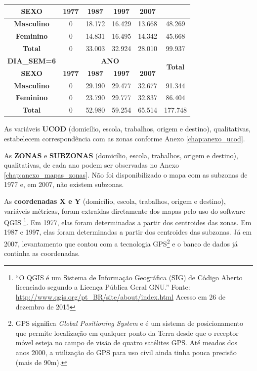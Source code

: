 \begin{table}[htb]
{\begin{tabular}{cccccc}
		\textbf{SEXO} & \textbf{1977} & \textbf{1987} & \textbf{1997} & \multicolumn{1}{c}{\textbf{2007}} & \multicolumn{1}{c}{}\\ \midrule \midrule
		\textbf{Masculino}   & 0 & 18.172 & 16.429 & 13.668 & 48.269\\ \hline
		\textbf{Feminino}    & 0 & 14.831 & 16.495 & 14.342 & 45.668\\ \hline
		\textbf{Total}       & 0 & 33.003 & 32.924 & 28.010 & 99.937\\ \bottomrule				
		\textbf{DIA\_SEM=6} & \multicolumn{4}{c}{\textbf{ANO}} & \multicolumn{1}{c}{\multirow{2}{*}{\textbf{Total}}} \\ \cline{1-5}
		\textbf{SEXO} & \textbf{1977} & \textbf{1987} & \textbf{1997} & \multicolumn{1}{c}{\textbf{2007}} & \multicolumn{1}{c}{}\\ \midrule \midrule
		\textbf{Masculino}   & 0 & 29.190 & 29.477 & 32.677 & 91.344\\ \hline
		\textbf{Feminino}    & 0 & 23.790 & 29.777 & 32.837 & 86.404\\ \hline
		\textbf{Total}       & 0 & 52.980 & 59.254 & 65.514 & 177.748\\ \bottomrule				
		\end{tabular}
    }

\end{table}

As variáveis \textbf{UCOD} (domicílio, escola, trabalhos, origem e destino), qualitativas, estabelecem correspondência com as zonas conforme Anexo \ref{chap:anexo_ucod}.

As \textbf{ZONAS} e \textbf{SUBZONAS} (domicílio, escola, trabalhos, origem e destino), qualitativas, de cada ano podem ser observadas no Anexo \ref{chap:anexo_mapas_zonas}. Não foi disponibilizado o mapa com as subzonas de 1977 e, em 2007, não existem subzonas.

As \textbf{coordenadas X e Y} (domicílio, escola, trabalhos, origem e destino), variáveis métricas, foram extraídas diretamente dos mapas pelo uso do software QGIS \footnote{``O QGIS é um Sistema de Informação Geográfica (SIG) de Código Aberto licenciado segundo a Licença Pública Geral GNU.'' Fonte: \url{http://www.qgis.org/pt_BR/site/about/index.html} Acesso em 26 de dezembro de 2015}. Em 1977, elas foram determinadas a partir dos centroides das zonas. Em 1987 e 1997, elas foram determinadas a partir dos centroides das subzonas. Já em 2007, levantamento que contou com a tecnologia GPS\footnote{GPS significa \textit{Global Positioning System} e é um sistema de posicionamento que permite localização em qualquer ponto da Terra desde que o receptor móvel esteja no campo de visão de quatro satélites GPS. Até meados dos anos 2000, a utilização do GPS para uso civil ainda tinha pouca precisão (mais de 90m).} e o banco de dados já continha as coordenadas.

